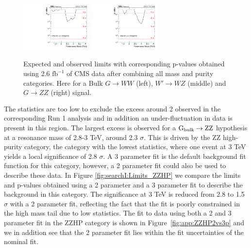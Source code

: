 \begin{figure}[h!]
\includegraphics[width=0.32\textwidth]{figures/analysis/search1/AN-15-211/pvalues/pvalue_WZin_combined_new.pdf}
\includegraphics[width=0.32\textwidth]{figures/analysis/search1/AN-15-211/pvalues/pvalue_BulkZZin_combined_new.pdf}\\
\caption{Expected and observed limits with corresponding p-values obtained using 2.6 $\textrm{fb}^{-1}$ of CMS data after combining all mass and purity categories. Here for a Bulk $G\rightarrow WW$ (left), $W'\rightarrow WZ$ (middle) and $G\rightarrow ZZ$ (right) signal.}
\label{fig:searchI:Limits_CombNew}
\end{figure}


The statistics are too low to exclude the excess around 2 \TeV observed in the corresponding Run 1 analysis and in addition an under-fluctuation in data is present in this region. The largest excess is observed for a $\mathrm{G}_\mathrm{bulk} \rightarrow \mathrm{Z}\mathrm{Z}$ hypothesis at a resonance mass of 2.8-3 TeV, around 2.3 $\sigma$.
This is driven by the ZZ high-purity category, the category with the lowest statistics, where one event at 3 TeV yields a local significance of 2.8 $\sigma$. A 3 parameter fit is the default background fit function for this category, however, a 2 parameter fit could also be used to describe these data. In Figure \ref{fig:searchI:Limits_ZZHP} we compare the limits and p-values obtained using a 2 parameter and a 3 parameter fit to describe the background in this category. The significance at 3 TeV is reduced from 2.8 to 1.5 $\sigma$ with a 2 parameter fit, reflecting the fact that the fit is poorly constrained in the high mass tail due to low statistics. The fit to data using both a 2 and 3 parameter fit in the ZZHP category is shown in Figure~\ref{fig:app:ZZHP2vs3p} and we in addition see that the 2 parameter fit lies within the fit uncertainties of the nominal fit.\newline
\newline

